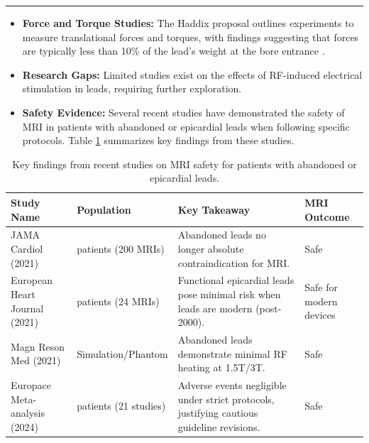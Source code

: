 \documentclass[final]{article}
\newcommand{\posterSection}[1]{
    \noindent{
        \color{DarkBlue}
        \fontsize{50}{60}\bfseries #1
    }
    \vspace{0.5em}
    \hrule
    \vspace{1em}
}
\begin{document}
\begin{multicols}{3}
\posterSection{Recent Advancements}
\begin{itemize}
    \item \textbf{Force and Torque Studies:} The Haddix proposal outlines experiments to measure translational forces and torques, with findings suggesting that forces are typically less than 10\% of the lead's weight at the bore entrance \cite{haddix2022}.
    \item \textbf{Research Gaps:} Limited studies exist on the effects of RF-induced electrical stimulation in leads, requiring further exploration.
    \item \textbf{Safety Evidence:} Several recent studies have demonstrated the safety of MRI in patients with abandoned or epicardial leads when following specific protocols. Table \ref{tab:recent_findings} summarizes key findings from these studies.
\end{itemize}

\begin{table}[H]
    \centering
    \renewcommand{\arraystretch}{1.5}
    \setlength{\tabcolsep}{8pt}
    \begin{tabular}{|>{\raggedright\arraybackslash}p{9.5cm}|
                      >{\raggedright\arraybackslash}p{5cm}|
                      >{\raggedright\arraybackslash}p{12.5cm}|
                      >{\raggedright\arraybackslash}p{5cm}|}
        \hline
        \textbf{Study Name} & \textbf{Population} & \textbf{Key Takeaway} & \textbf{MRI Outcome} \\
        \hline
        JAMA Cardiol (2021) \cite{schaller2021} & 
        139 patients (200 MRIs) & 
        Abandoned leads no longer absolute contraindication for MRI. & 
        Safe \\
        \hline
        European Heart Journal (2021) \cite{vuorinen2021} & 
        16 patients (24 MRIs) & 
        Functional epicardial leads pose minimal risk when leads are modern (post-2000). & 
        Safe for modern devices \\
        \hline
        Magn Reson Med (2021) \cite{nguyen2021} & 
        Simulation/Phantom & 
        Abandoned leads demonstrate minimal RF heating at 1.5T/3T. & 
        Safe \\
        \hline
        Europace Meta-analysis (2024) \cite{meier2024} & 
        656 patients (21 studies) & 
        Adverse events negligible under strict protocols, justifying cautious guideline revisions. & 
        Safe \\
        \hline
    \end{tabular}
    \caption{Key findings from recent studies on MRI safety for patients with abandoned or epicardial leads.}
    \label{tab:recent_findings}
\end{table}


\end{multicols}
\end{document}

